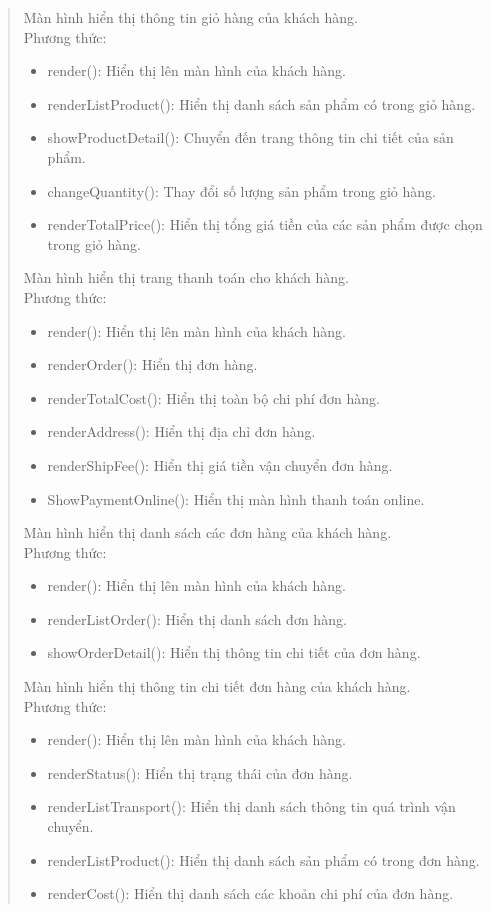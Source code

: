 \begin{quote}
	Màn hình hiển thị thông tin giỏ hàng của khách hàng.\\
	Phương thức:
	\begin{itemize}
		\item render(): Hiển thị lên màn hình của khách hàng.
		\item renderListProduct(): Hiển thị danh sách sản phẩm có trong giỏ hàng.
		\item showProductDetail(): Chuyển đến trang thông tin chi tiết của sản phẩm.
		\item changeQuantity(): Thay đổi số lượng sản phẩm trong giỏ hàng.
		\item renderTotalPrice(): Hiển thị tổng giá tiền của các sản phẩm được chọn trong giỏ hàng.
	\end{itemize}

	Màn hình hiển thị trang thanh toán cho khách hàng.\\
	Phương thức:
	\begin{itemize}
		\item render(): Hiển thị lên màn hình của khách hàng.
		\item renderOrder(): Hiển thị đơn hàng.
		\item renderTotalCost(): Hiển thị toàn bộ chi phí đơn hàng.
		\item renderAddress(): Hiển thị địa chỉ đơn hàng.
		\item renderShipFee(): Hiển thị giá tiền vận chuyển đơn hàng.
		\item ShowPaymentOnline(): Hiển thị màn hình thanh toán online.
	\end{itemize}

	Màn hình hiển thị danh sách các đơn hàng của khách hàng.\\
	Phương thức:
	\begin{itemize}
		\item render(): Hiển thị lên màn hình của khách hàng.
		\item renderListOrder(): Hiển thị danh sách đơn hàng.
		\item showOrderDetail(): Hiển thị thông tin chi tiết của đơn hàng.
	\end{itemize}

	Màn hình hiển thị thông tin chi tiết đơn hàng của khách hàng.\\
	Phương thức:
	\begin{itemize}
		\item render(): Hiển thị lên màn hình của khách hàng.
		\item renderStatus(): Hiển thị trạng thái của đơn hàng.
		\item renderListTransport(): Hiển thị danh sách thông tin quá trình vận chuyển.
		\item renderListProduct(): Hiển thị danh sách sản phẩm có trong đơn hàng.
		\item renderCost(): Hiển thị danh sách các khoản chi phí của đơn hàng.
	\end{itemize}


\end{quote}
